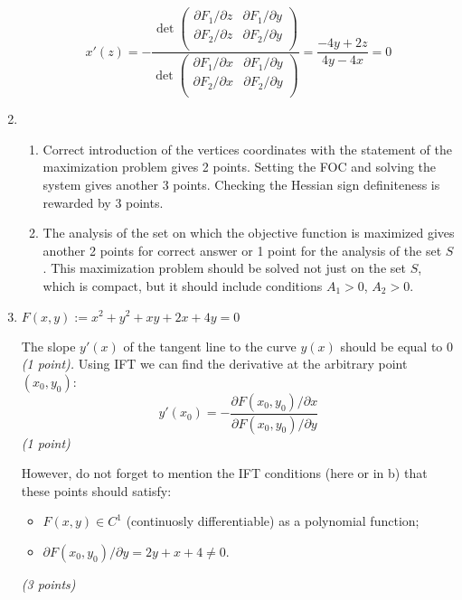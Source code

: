 \begin{enumerate}
    \[    
    x'(z) = - \frac{\det \begin{pmatrix}  
       \partial F_1/\partial z & \partial F_1 / \partial y \\
       \partial F_2/\partial z & \partial F_2 / \partial y \\
    \end{pmatrix}}{\det \begin{pmatrix}
        \partial F_1/\partial x & \partial F_1 / \partial y \\
        \partial F_2/\partial x & \partial F_2 / \partial y \\         
    \end{pmatrix}} = \frac{-4y + 2z}{4y-4x} = 0
    \]
    \item \begin{enumerate}
        \item  Correct introduction of the vertices coordinates with the statement of the maximization problem gives 2 points. 
    Setting the FOC and solving the system gives another 3 points. 
    Checking the Hessian sign definiteness is rewarded by 3 points. 
    \item The analysis of the set on which the objective function is maximized gives another 2 points for correct answer 
    or 1 point for the analysis of the set $S$. 
    This maximization problem should be solved not just on the set $S$, which is compact, but it should include conditions $A_1 >0$, $A_2 > 0$.
\end{enumerate}

\item

    
    $F(x,y):= x^2+y^2+xy+2x+4y = 0$
    
    The slope $y'(x)$ of the tangent line to the curve $y(x)$ should be equal to 0 \textit{(1 point).} 
    Using IFT we can find the derivative at the arbitrary point $(x_0,y_0)$:
    \[
    y'(x_0) = -\frac{\partial F(x_0,y_0)/\partial x }{\partial F(x_0,y_0)/\partial y}
    \]
    \textit{(1 point)}
    
    However, do not forget to mention the IFT conditions (here or in b) that these points should satisfy:
    \begin{itemize}
        \item $F(x,y)\in C^1$ (continuosly differentiable) as a polynomial function;
        \item $\partial F(x_0,y_0)/\partial y = 2y+x+4 \neq 0$.
    \end{itemize}\textit{(3 points)}
    

\end{enumerate}
